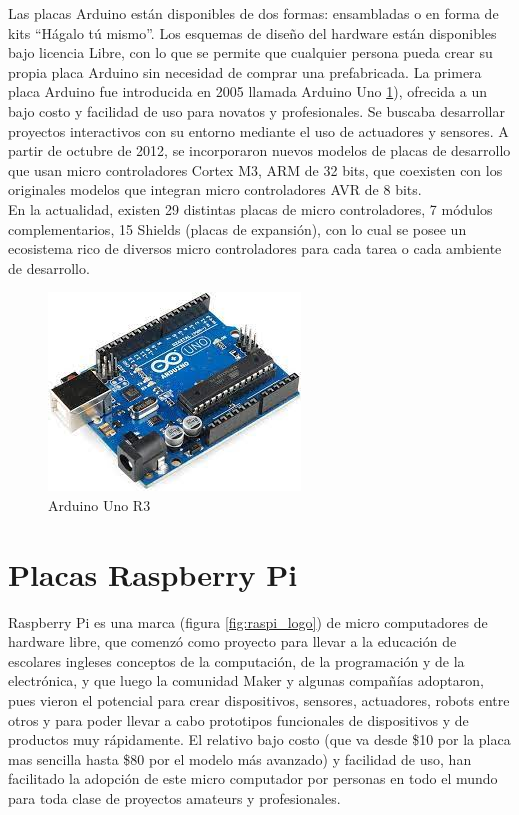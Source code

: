 Las placas Arduino están disponibles de dos formas: ensambladas o en forma de kits ``Hágalo tú mismo''. Los esquemas de diseño del hardware están disponibles bajo licencia Libre, con lo que se permite que cualquier persona pueda crear su propia placa Arduino sin necesidad de comprar una prefabricada. La primera placa Arduino fue introducida en 2005 llamada Arduino Uno \ref{fig:arduinouno}), ofrecida a un bajo costo y facilidad de uso para novatos y profesionales. Se buscaba desarrollar proyectos interactivos con su entorno mediante el uso de actuadores y sensores. A partir de octubre de 2012, se incorporaron nuevos modelos de placas de desarrollo que usan micro controladores Cortex M3, ARM de 32 bits, que coexisten con los originales modelos que integran micro controladores AVR de 8 bits.\\

En la actualidad, existen 29 distintas placas de micro controladores, 7 módulos complementarios, 15 Shields (placas de expansión), con lo cual se posee un ecosistema rico de diversos micro controladores para cada tarea o cada ambiente de desarrollo. 

\begin{figure}[htb]
\centering
\includegraphics[scale=0.7]{./Figuras/arduino_uno.jpeg}
\caption{Arduino Uno R3}
\label{fig:arduinouno}
\vspace*{-10pt}
\end{figure}

\section{Placas Raspberry Pi}
Raspberry Pi es una marca (figura \ref{fig:raspi_logo}) de micro computadores de hardware libre, que comenzó como proyecto para llevar a la educación  de escolares ingleses conceptos de la computación, de la programación y de la electrónica, y que luego la comunidad Maker y algunas compañías adoptaron, pues vieron el potencial para crear dispositivos, sensores, actuadores, robots entre otros y para poder llevar a cabo prototipos funcionales de dispositivos y de productos muy rápidamente. El relativo bajo costo (que va desde \$10 por la placa mas sencilla hasta \$80 por el modelo más avanzado) y facilidad de uso, han facilitado la adopción de este micro computador por personas en todo el mundo para toda clase de proyectos amateurs y profesionales.

